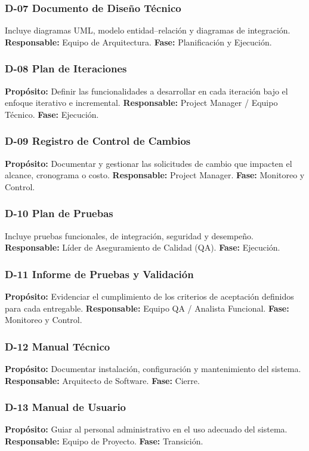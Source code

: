 \subsubsection*{D-07 Documento de Diseño Técnico}
Incluye diagramas UML, modelo entidad–relación y diagramas de integración.  
\textbf{Responsable:} Equipo de Arquitectura.  
\textbf{Fase:} Planificación y Ejecución.

\subsubsection*{D-08 Plan de Iteraciones}
\textbf{Propósito:} Definir las funcionalidades a desarrollar en cada iteración bajo el enfoque iterativo e incremental.  
\textbf{Responsable:} Project Manager / Equipo Técnico.  
\textbf{Fase:} Ejecución.

\subsubsection*{D-09 Registro de Control de Cambios}
\textbf{Propósito:} Documentar y gestionar las solicitudes de cambio que impacten el alcance, cronograma o costo.  
\textbf{Responsable:} Project Manager.  
\textbf{Fase:} Monitoreo y Control.

\subsubsection*{D-10 Plan de Pruebas}
Incluye pruebas funcionales, de integración, seguridad y desempeño.  
\textbf{Responsable:} Líder de Aseguramiento de Calidad (QA).  
\textbf{Fase:} Ejecución.

\subsubsection*{D-11 Informe de Pruebas y Validación}
\textbf{Propósito:} Evidenciar el cumplimiento de los criterios de aceptación definidos para cada entregable.  
\textbf{Responsable:} Equipo QA / Analista Funcional.  
\textbf{Fase:} Monitoreo y Control.

\subsubsection*{D-12 Manual Técnico}
\textbf{Propósito:} Documentar instalación, configuración y mantenimiento del sistema.  
\textbf{Responsable:} Arquitecto de Software.  
\textbf{Fase:} Cierre.

\subsubsection*{D-13 Manual de Usuario}
\textbf{Propósito:} Guiar al personal administrativo en el uso adecuado del sistema.  
\textbf{Responsable:} Equipo de Proyecto.  
\textbf{Fase:} Transición.

